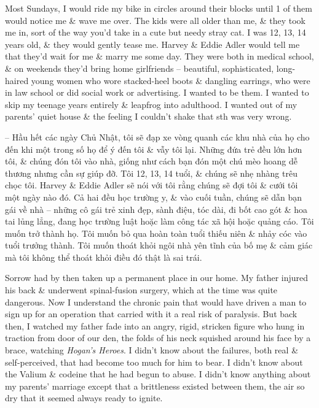 \documentclass{article}
\begin{document}
\begin{itemize}
	Most Sundays, I would ride my bike in circles around their blocks until 1 of them would notice me \& wave me over. The kids were all older than me, \& they took me in, sort of the way you'd take in a cute but needy stray cat. I was 12, 13, 14 years old, \& they would gently tease me. {\sc Harvey \& Eddie Adler} would tell me that they'd wait for me \& marry me some day. They were both in medical school, \& on weekends they'd bring home girlfriends -- beautiful, sophisticated, long-haired young women who wore stacked-heel boots \& dangling earrings, who were in law school or did social work or advertising. I wanted to be them. I wanted to skip my teenage years entirely \& leapfrog into adulthood. I wanted out of my parents' quiet house \& the feeling I couldn't shake that sth was very wrong.
	
	-- Hầu hết các ngày Chủ Nhật, tôi sẽ đạp xe vòng quanh các khu nhà của họ cho đến khi một trong số họ để ý đến tôi \& vẫy tôi lại. Những đứa trẻ đều lớn hơn tôi, \& chúng đón tôi vào nhà, giống như cách bạn đón một chú mèo hoang dễ thương nhưng cần sự giúp đỡ. Tôi 12, 13, 14 tuổi, \& chúng sẽ nhẹ nhàng trêu chọc tôi. {\sc Harvey \& Eddie Adler} sẽ nói với tôi rằng chúng sẽ đợi tôi \& cưới tôi một ngày nào đó. Cả hai đều học trường y, \& vào cuối tuần, chúng sẽ dẫn bạn gái về nhà -- những cô gái trẻ xinh đẹp, sành điệu, tóc dài, đi bốt cao gót \& hoa tai lủng lẳng, đang học trường luật hoặc làm công tác xã hội hoặc quảng cáo. Tôi muốn trở thành họ. Tôi muốn bỏ qua hoàn toàn tuổi thiếu niên \& nhảy cóc vào tuổi trưởng thành. Tôi muốn thoát khỏi ngôi nhà yên tĩnh của bố mẹ \& cảm giác mà tôi không thể thoát khỏi điều đó thật là sai trái.
	
	Sorrow had by then taken up a permanent place in our home. My father injured his back \& underwent spinal-fusion surgery, which at the time was quite dangerous. Now I understand the chronic pain that would have driven a man to sign up for an operation that carried with it a real risk of paralysis. But back then, I watched my father fade into an angry, rigid, stricken figure who hung in traction from door of our den, the folds of his neck squished around his face by a brace, watching {\it Hogan's Heroes}. I didn't know about the failures, both real \& self-perceived, that had become too much for him to bear. I didn't know about the Valium \& codeine that he had begun to abuse. I didn't know anything about my parents' marriage except that a brittleness existed between them, the air so dry that it seemed always ready to ignite.
	

\end{itemize}
\end{document}
